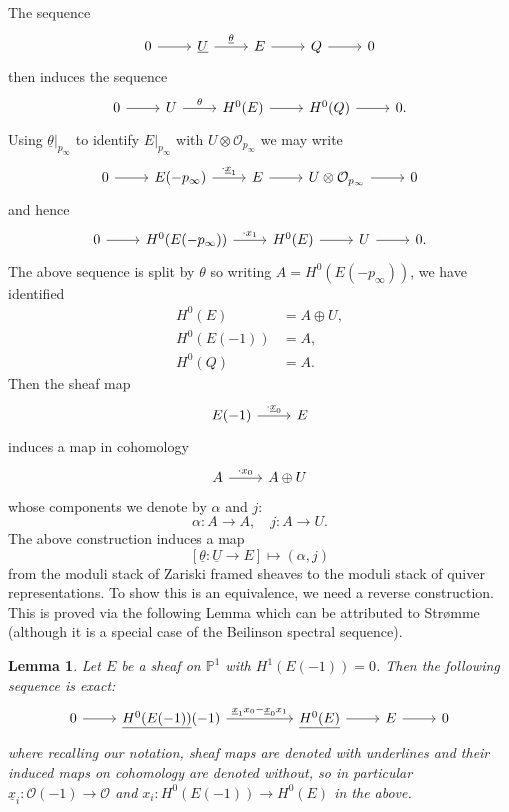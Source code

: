 \message{ !name(Bryan-Vakil.tex)}\documentclass{amsart}
\newtheorem{lemma}[theorem]{Lemma}
\theoremstyle{definition}
\newcommand{\PP}{\mathbb{P}}
\newcommand{\OO}{\mathcal{O}}
\newcommand{\UL}[1]{\underline{#1}}
\begin{document}
The sequence
\[
\begin{tikzcd}
0\arrow[r]& \UL{U} \arrow{r}{\UL{\theta}} & E\arrow[r]&Q\arrow[r]&0
\end{tikzcd}
\]
then induces the sequence
\[
\begin{tikzcd}
0\arrow[r]& {U} \arrow{r}{{\theta}} &H^{0}(E)\arrow[r]&H^{0}(Q)\arrow[r]&0.
\end{tikzcd}
\]
Using $\UL{\theta}|_{p_{\infty}}$ to identify $E|_{p_{\infty}}$ with
$U\otimes \OO_{p_{\infty}}$ we may write
\[
\begin{tikzcd}
0\arrow[r]&E(-p_{\infty})\arrow{r}{\cdot \UL{x}_{1}}
&E\arrow[r]&U\otimes \OO_{p_{\infty}} \arrow[r] &0
\end{tikzcd}
\]
and hence
\[
\begin{tikzcd}
0\arrow[r]&H^{0}(E(-p_{\infty}))\arrow{r}{\cdot {x}_{1}}
&H^{0}(E)\arrow[r]&U \arrow[r] &0.
\end{tikzcd}
\]
The above sequence is split by $\theta$ so writing
$A=H^{0}(E(-p_{\infty}))$, we have identified
\begin{align*}
H^{0}(E) &= A\oplus U,\\
H^{0}(E(-1))&= A,\\
H^{0}(Q)&= A.
\end{align*}
Then the sheaf map
\[
\begin{tikzcd}
E(-1)\arrow{r}{\cdot \UL{x}_{0}}
&E
\end{tikzcd}
\]
induces a map in cohomology
\[
\begin{tikzcd}
A\arrow{r}{\cdot x_{0}} &A\oplus U
\end{tikzcd}
\]
whose components we denote by $\alpha$ and $j$:
\[
\alpha :A\to A, \quad j: A\to U.
\]
The above construction induces a map 
\[
[\UL{\theta}:\UL{U}\to E]\mapsto (\alpha ,j)
\]
from the moduli stack of Zariski framed sheaves to the moduli stack of
quiver representations. To show this is an equivalence, we need a
reverse construction. This is proved via the following Lemma which can
be attributed to Str\o mme \cite[Prop~1.1]{Stromme} (although it is a
special case of the Beilinson spectral sequence).
\begin{lemma}\label{lem: Stromme}
Let $E$ be a sheaf on $\PP^{1}$ with $H^{1}(E(-1))=0$. Then the following
sequence is exact:
\[
\begin{tikzcd}
0\arrow{r} & \UL{H^{0}(E(-1))}(-1)
\arrow{rr}{\UL{x}_{1}x_{0}-\UL{x}_{0}x_{1}}& &
\UL{H^{0}(E)} \arrow{r} & E\arrow[r] & 0
\end{tikzcd}
\]
where recalling our notation, sheaf maps are denoted with
underlines and their induced maps on cohomology are denoted without,
so in particular $\UL{x}_{i}:\OO (-1)\to \OO$ and
$x_{i}:H^{0}(E(-1))\to H^{0}(E)$ in the above.
\end{lemma}
\end{document}
